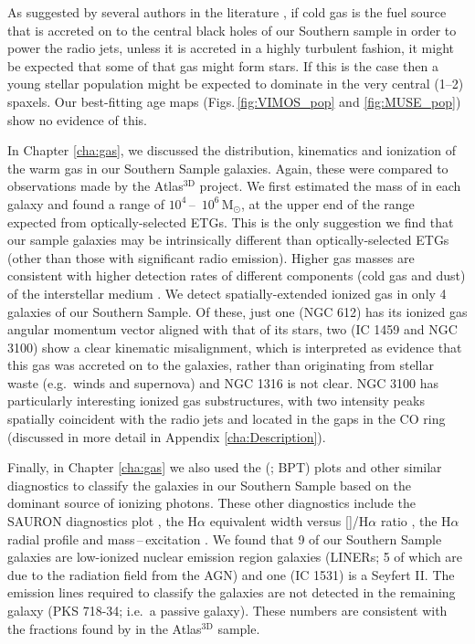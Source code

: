 As suggested by several authors in the literature \citep[e.g.][]{Collin1999, Diamond-Stanic2012, LaMassa2013}, if cold gas is the fuel source that is accreted on to the central black holes of our Southern sample in order to power the radio jets, unless it is accreted in a highly turbulent fashion, it might be expected that some of that gas might form stars. If this is the case then a young stellar population might be expected to dominate in the very central (1--2) spaxels. Our best-fitting age maps (Figs.\,\ref{fig:VIMOS_pop} and \ref{fig:MUSE_pop}) show no evidence of this. 

In Chapter \ref{cha:gas}, we discussed the distribution, kinematics and ionization of the warm gas in our Southern Sample galaxies. Again, these were compared to observations made by the Atlas$^\text{3D}$ project. We first estimated the mass of  in each galaxy and found a range of $10^4$\,--\, $10^6\,\mathrm{M_\odot}$, at the upper end of the range expected from optically-selected ETGs. This is the only suggestion we find that our sample galaxies may be intrinsically different than optically-selected ETGs (other than those with significant radio emission). Higher gas masses are consistent with higher detection rates of different components (cold gas and dust) of the interstellar medium \citep[ISM; e.g.][]{DeRuiter2002, Leon2003, VerdoesKleijn2005}. We detect spatially-extended ionized gas in only 4 galaxies of our Southern Sample. Of these, just one (NGC 612) has its ionized gas angular momentum vector aligned with that of its stars, two (IC 1459 and NGC 3100) show a clear kinematic misalignment, which is interpreted as evidence that this gas was accreted on to the galaxies, rather than originating from stellar waste (e.g.\ winds and supernova) and NGC 1316 is not clear. NGC 3100 has particularly interesting ionized gas substructures, with two intensity peaks spatially coincident with the radio jets and located in the gaps in the CO ring (discussed in more detail in Appendix \ref{cha:Description}). 

Finally, in Chapter \ref{cha:gas} we also used the \citeauthor{Baldwin1981} (\citeyear{Baldwin1981}; BPT) plots and other similar diagnostics to classify the galaxies in our Southern Sample based on the dominant source of ionizing photons. These other diagnostics include the SAURON diagnostics plot \citep{Sarzi2010}, the H$\alpha$ equivalent width versus []/H$\alpha$ ratio \citep[WHaN2;][]{CidFernandes2011}, the H$\alpha$ radial profile and mass\,--\,excitation \citep[MEx;][]{Nyland2016}. We found that 9 of our Southern Sample galaxies are low-ionized nuclear emission region galaxies (LINERs; 5 of which are due to the radiation field from the AGN) and one (IC 1531) is a Seyfert II. The emission lines required to classify the galaxies are not detected in the remaining galaxy (PKS 718-34; i.e.\ a passive galaxy). These numbers are consistent with the fractions found by \citet{Nyland2016} in the Atlas$^\text{3D}$ sample.

